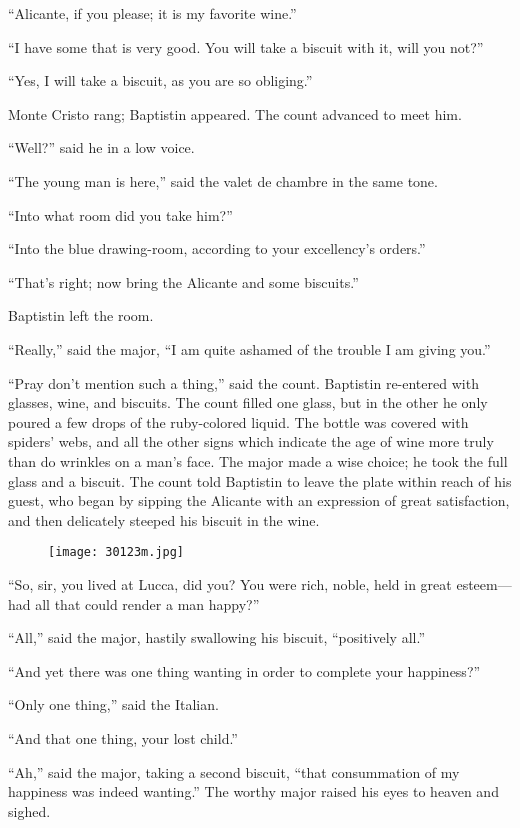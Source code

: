 “Alicante, if you please; it is my favorite wine.”

“I have some that is very good. You will take a biscuit with it, will
you not?”

“Yes, I will take a biscuit, as you are so obliging.”

Monte Cristo rang; Baptistin appeared. The count advanced to meet him.

“Well?” said he in a low voice.

“The young man is here,” said the valet de chambre in the same tone.

“Into what room did you take him?”

“Into the blue drawing-room, according to your excellency’s orders.”

“That’s right; now bring the Alicante and some biscuits.”

Baptistin left the room.

“Really,” said the major, “I am quite ashamed of the trouble I am
giving you.”

“Pray don’t mention such a thing,” said the count. Baptistin re-entered
with glasses, wine, and biscuits. The count filled one glass, but in
the other he only poured a few drops of the ruby-colored liquid. The
bottle was covered with spiders’ webs, and all the other signs which
indicate the age of wine more truly than do wrinkles on a man’s face.
The major made a wise choice; he took the full glass and a biscuit. The
count told Baptistin to leave the plate within reach of his guest, who
began by sipping the Alicante with an expression of great satisfaction,
and then delicately steeped his biscuit in the wine.

\begin{figure}[ht]
\texttt{[image: 30123m.jpg]}
\end{figure}

“So, sir, you lived at Lucca, did you? You were rich, noble, held in
great esteem—had all that could render a man happy?”

“All,” said the major, hastily swallowing his biscuit, “positively
all.”

“And yet there was one thing wanting in order to complete your
happiness?”

“Only one thing,” said the Italian.

“And that one thing, your lost child.”

“Ah,” said the major, taking a second biscuit, “that consummation of my
happiness was indeed wanting.” The worthy major raised his eyes to
heaven and sighed.


